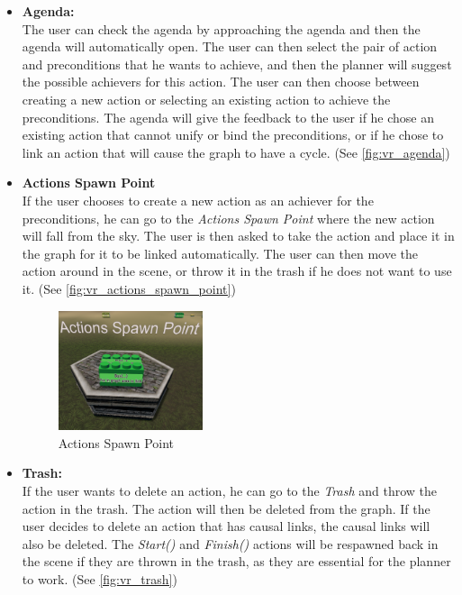 \begin{itemize}
    \item \textbf{Agenda:} \\
          The user can check the agenda by approaching the agenda and then the agenda will automatically open. The user can then select the pair of action and preconditions that he wants to achieve, and then the planner will suggest the possible achievers for this action. The user can then choose between creating a new action or selecting an existing action to achieve the preconditions. The agenda will give the feedback to the user if he chose an existing action that cannot unify or bind the preconditions, or if he chose to link an action that will cause the graph to have a cycle. (See \autoref{fig:vr_agenda})

    \item \textbf{Actions Spawn Point} \\
          If the user chooses to create a new action as an achiever for the preconditions, he can go to the \textit{Actions Spawn Point} where the new action will fall from the sky. The user is then asked to take the action and place it in the graph for it to be linked automatically. The user can then move the action around in the scene, or throw it in the trash if he does not want to use it. (See \autoref{fig:vr_actions_spawn_point})

          \begin{figure}[h]
              \centering
              \includegraphics[width=0.4\textwidth]{images/actions_spawn.png}
              \caption[Actions Spawn Point in VR]{Actions Spawn Point}
              \label{fig:vr_actions_spawn_point}
          \end{figure}

    \item \textbf{Trash:} \\
          If the user wants to delete an action, he can go to the \textit{Trash} and throw the action in the trash. The action will then be deleted from the graph. If the user decides to delete an action that has causal links, the causal links will also be deleted. The \textit{Start()} and \textit{Finish()} actions will be respawned back in the scene if they are thrown in the trash, as they are essential for the planner to work. (See \autoref{fig:vr_trash})


\end{itemize}
